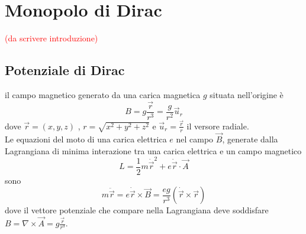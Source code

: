 \chapter{Monopolo di Dirac}
\textcolor{red}{(da scrivere introduzione)}\\
\section{Potenziale di Dirac}

il campo magnetico generato da una carica magnetica $g$ situata nell'origine è
$$
   B = g \frac{\vec r}{r^3} = \frac{g}{r^2} \vec u _r
$$
dove $\vec r = (x,y,z)$ , $r = \sqrt{x^2 + y^2 + z^2}$ e $\vec u _r = \frac{\vec r}{r}$
il versore radiale.\\
Le equazioni del moto di una carica elettrica $e$ nel campo $\vec B$,
generate dalla Lagrangiana di minima interazione tra una carica elettrica e un campo
magnetico
$$
   L = \frac{1}{2} m \dot{\vec r} ^2 + e \dot{\vec r} \cdot \vec A
$$
sono
$$
   m \ddot{\vec r} = e\dot{\vec r} \times \vec B =
      \frac{eg}{r^3}(\dot{\vec r} \times \vec r)
$$
dove il vettore potenziale che compare nella Lagrangiana deve soddisfare
$B = \nabla \times \vec A = g \frac{\vec r}{r^3}$.\\


